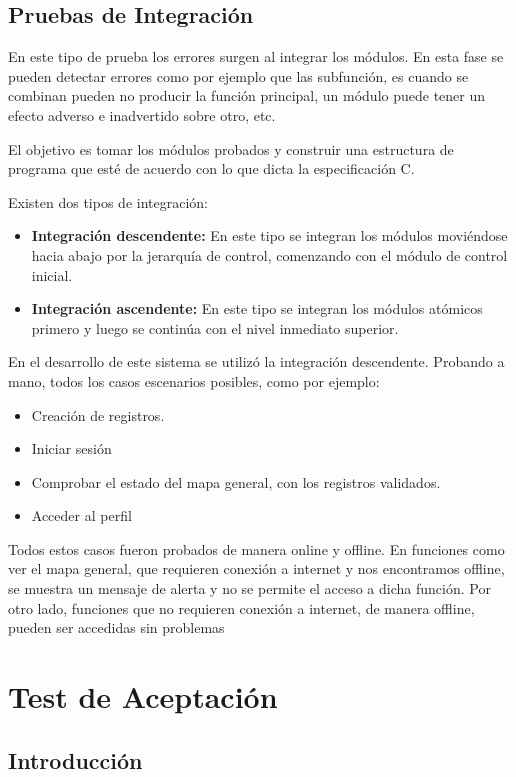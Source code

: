 	\subsection{Pruebas de Integración}

		En este tipo de prueba los errores surgen al integrar los módulos. En esta fase se pueden detectar errores como por ejemplo que las subfunción, es cuando se combinan pueden no producir la función principal, un módulo puede tener un efecto adverso e inadvertido sobre otro, etc.

		El objetivo es tomar los módulos probados y construir una estructura de programa que esté de acuerdo con lo que dicta la especificación C.
			
		Existen dos tipos de integración:
			\begin{itemize}
				\item \textbf{Integración descendente:} En este tipo se integran los módulos moviéndose hacia abajo por la jerarquía de control, comenzando con el módulo de control inicial.
				\item \textbf{Integración ascendente:} En este tipo se integran los módulos atómicos primero y luego se continúa con el nivel inmediato superior.
			\end{itemize}

	En el desarrollo de este sistema se utilizó la integración descendente. Probando a mano, todos los casos escenarios posibles, como por ejemplo:
	\begin{itemize}
		\item Creación de registros.
		\item Iniciar sesión
		\item Comprobar el estado del mapa general, con los registros validados.
		\item Acceder al perfil
	\end{itemize}
	Todos estos casos fueron probados de manera online y offline.
	En funciones como ver el mapa general, que requieren conexión a internet y nos encontramos offline, se muestra un mensaje de alerta y no se permite el acceso a dicha función. Por otro lado, funciones que no requieren conexión a internet, de manera offline, pueden ser accedidas sin problemas

\section{Test de Aceptación}

	\subsection{Introducción}

